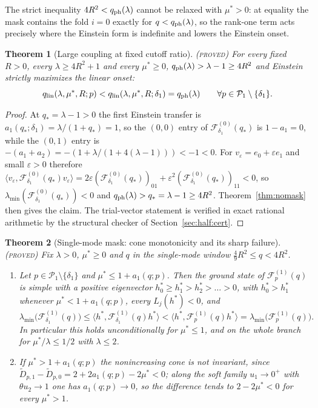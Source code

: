 \documentclass[11pt]{article}
\newcommand{\Fcal}{\mathcal F}
\newcommand{\muS}{\mu^{*}}
\newtheorem{theorem}{Theorem}[section]
\theoremstyle{definition}
\theoremstyle{remark}
\newcommand{\proved}{\textnormal{\textsc{(proved)}}}
\begin{document}
The strict inequality $4R^2<q_{\rm ph}(\lambda)$ cannot be relaxed with $\muS>0$: at
equality the mask contains the fold $i=0$ exactly for $q<q_{\rm ph}(\lambda)$, so the
rank-one term acts precisely where the Einstein form is indefinite and lowers the
Einstein onset.

\begin{theorem}[Large coupling at fixed cutoff ratio]\label{thm:large}\proved
For every fixed $R>0$, every $\lambda\ge4R^2+1$ and every $\muS\ge0$,
$q_{\rm ph}(\lambda)>\lambda-1\ge4R^2$ and Einstein strictly maximizes the linear onset:
\[
q_{\rm lin}(\lambda,\muS,R;p)<q_{\rm lin}(\lambda,\muS,R;\delta_1)=q_{\rm ph}(\lambda)
\qquad\forall p\in\mathcal P_1\setminus\{\delta_1\}.
\]
\end{theorem}

\begin{proof}
At $q_*=\lambda-1>0$ the first Einstein transfer is $a_1(q_*;\delta_1)=\lambda/(1+q_*)=1$,
so the $(0,0)$ entry of $\Fcal_{\delta_1}^{(0)}(q_*)$ is $1-a_1=0$, while the $(0,1)$
entry is $-(a_1+a_2)=-(1+\lambda/(1+4(\lambda-1)))<-1<0$. For
$v_\varepsilon=e_0+\varepsilon e_1$ and small $\varepsilon>0$ therefore
$\langle v_\varepsilon,\Fcal_{\delta_1}^{(0)}(q_*)v_\varepsilon\rangle
=2\varepsilon(\Fcal_{\delta_1}^{(0)}(q_*))_{01}
+\varepsilon^2(\Fcal_{\delta_1}^{(0)}(q_*))_{11}<0$, so
$\lambda_{\min}(\Fcal_{\delta_1}^{(0)}(q_*))<0$ and
$q_{\rm ph}(\lambda)>q_*=\lambda-1\ge4R^2$. Theorem~\ref{thm:nomask} then gives the
claim. The trial-vector statement is verified in exact rational arithmetic by the
structural checker of Section~\ref{sec:half:cert}.
\end{proof}

\begin{theorem}[Single-mode mask: cone monotonicity and its sharp failure]
\label{thm:cone}\proved
Fix $\lambda>0$, $\muS\ge0$ and $q$ in the single-mode window
$\tfrac49R^2\le q<4R^2$.
\begin{enumerate}[label=(\roman*),leftmargin=2.2em]
\item Let $p\in\mathcal P_1\setminus\{\delta_1\}$ and $\muS\le1+a_1(q;p)$. Then the
ground state of $\Fcal_p^{(1)}(q)$ is simple with a positive eigenvector
$h^*_0\ge h^*_1>h^*_2>\dots>0$, with $h^*_0>h^*_1$ whenever
$\muS<1+a_1(q;p)$, every $L_j(h^*)<0$, and
\begin{equation}\label{eq:conedom}
\lambda_{\min}\big(\Fcal_{\delta_1}^{(1)}(q)\big)
\le\langle h^*,\Fcal_{\delta_1}^{(1)}(q)h^*\rangle
<\langle h^*,\Fcal_p^{(1)}(q)h^*\rangle
=\lambda_{\min}\big(\Fcal_p^{(1)}(q)\big).
\end{equation}
In particular this holds unconditionally for $\muS\le1$, and on the whole branch for
$\muS/\lambda\le1/2$ with $\lambda\le2$.
\item If $\muS>1+a_1(q;p)$ the nonincreasing cone is not invariant, since
$\tilde D_{p,1}-\tilde D_{p,0}=2+2a_1(q;p)-2\muS<0$; along the soft family $u_1\to0^+$
with $\theta u_2\to1$ one has $a_1(q;p)\to0$, so the difference tends to $2-2\muS<0$ for
every $\muS>1$.
\end{enumerate}
\end{theorem}
\end{document}
